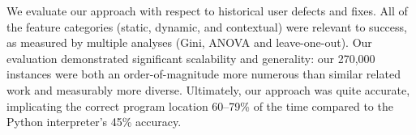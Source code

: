 \documentclass[conference]{IEEEtran}
\begin{document}
We evaluate our approach with respect to historical user defects and fixes.
All of the feature categories (static, dynamic, and contextual) were
relevant to success, as measured by multiple analyses (Gini, ANOVA and
leave-one-out). Our evaluation demonstrated significant scalability and
generality: our 270,000 instances were both an order-of-magnitude more
numerous than similar related work and measurably more diverse. Ultimately,
our approach was quite accurate, implicating the correct program location
60--79\% of the time compared to the Python interpreter's 45\% accuracy.



\end{document}
